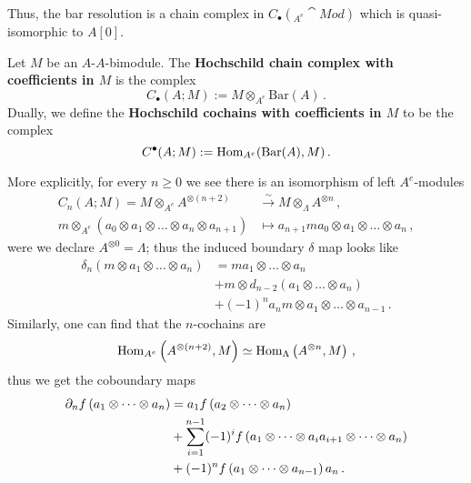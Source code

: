 	Thus, the bar resolution is a chain complex in $C_{\bullet}({}_{A^{e}}\cat{Mod})$
	which is quasi-isomorphic to $A[0]$. 
	
	\begin{df}
		Let $M$ be an $A$-$A$-bimodule. The \textbf{Hochschild chain complex 
		with coefficients in $M$} is the complex
		\begin{equation*}
			C_{\bullet}(A;M) := M \otimes_{A^{e}} \mathrm{Bar}(A)\,.
		\end{equation*}
		Dually, we define the \textbf{Hochschild cochains
		with coefficients in $M$} to be the complex
		\begin{equation*}
			C^{\bullet}(A;M) := \operatorname{Hom}_{A^{e}}(\mathrm{Bar}(A),M)\,.
		\end{equation*}
	\end{df}
	
	More explicitly, for every $n \ge 0$ we see there is 
	an isomorphism of left $A^{e}$-modules
	\begin{align*}
		C_{n}(A;M) = M \otimes_{A^{e}} A^{\otimes (n+2)}
		 &\xrightarrow{\sim} M \otimes_{\Lambda} A^{\otimes n}\,, \\
		 m \otimes_{A^{e}} (a_{0} \otimes a_{1} \otimes \dots \otimes a_{n} \otimes a_{n+1})
		 &\longmapsto a_{n+1}ma_{0} \otimes a_{1} \otimes \dots \otimes a_{n}\,,
	\end{align*}
	were we declare $A^{\otimes 0} = \Lambda$;
	thus the induced boundary $\delta$ map looks like
	\begin{align*}
		\delta_{n}\left( m \otimes a_{1} \otimes \dots \otimes a_{n} \right)
		&= ma_{1} \otimes \dots \otimes a_{n} \\
		&+  m \otimes d_{n-2}\left(a_{1} \otimes \dots \otimes a_{n}\right) \\
		&+ (-1)^{n} a_{n}m \otimes a_{1} \otimes \dots \otimes a_{n-1}\,.
	\end{align*}
	Similarly, one can find that the $n$-cochains are
	\begin{equation}\label{HHcochains}
		\operatorname{Hom}_{A^{e}}\left(A^{\otimes (n+2)},M\right)
		\simeq \operatorname{Hom}_{\Lambda}\left(A^{\otimes n}, M\right)\,,
	\end{equation}
	thus we get the coboundary maps
	\begin{align*}
		\partial_{n} f \left(a_{1} \otimes \dots \otimes a_{n} \right)
		&= a_{1} f \left(a_{2} \otimes \dots \otimes a_{n} \right) \\
		&+ \sum_{i=1}^{n-1}(-1)^{i} f\left(a_{1} \otimes \dots \otimes a_{i}a_{i+1} \otimes \dots \otimes a_{n}\right) \\
		&+ (-1)^{n} f\left(a_{1} \otimes \dots \otimes a_{n-1}\right)a_{n}\,.
	\end{align*}
	

